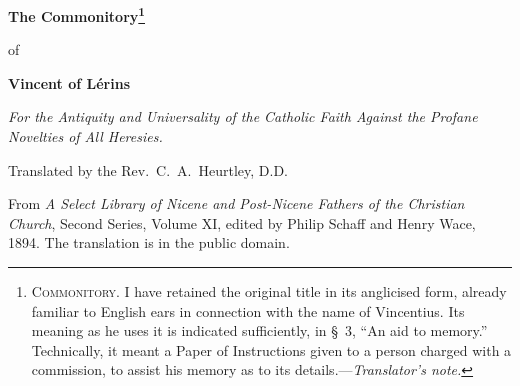 \documentclass[11pt,letterpaper]{article}
\begin{document}
\color{ink}

\begin{titlepage}
\centering
\vspace*{4em}
{\LARGE\bfseries\color{heading} The Commonitory\footnote{\textsc{Commonitory}.
I have retained the original title in its anglicised form, already familiar
to English ears in connection with the name of Vincentius. Its meaning as he
uses it is indicated sufficiently, in \S~3, ``An aid to memory.''
Technically, it meant a Paper of Instructions given to a person charged with
a commission, to assist his memory as to its details.---\emph{Translator's
note.}}\par}
\vspace{1em}
{\large of\par}
\vspace{1em}
{\LARGE\bfseries\color{heading} Vincent of Lérins\par}
\vspace{2em}
{\itshape\color{subhead} For the Antiquity and Universality of the Catholic
Faith Against the Profane Novelties of All Heresies.\par}
\vspace{3em}
{Translated by the Rev.\ C.\ A.\ Heurtley, D.D.\par}
\vfill
{\small From \emph{A Select Library of Nicene and Post-Nicene Fathers of the
Christian Church}, Second Series, Volume XI, edited by Philip Schaff and
Henry Wace, 1894. The translation is in the public domain.\par}
\vspace{2em}
\end{titlepage}

\tableofcontents
\clearpage


\end{document}
